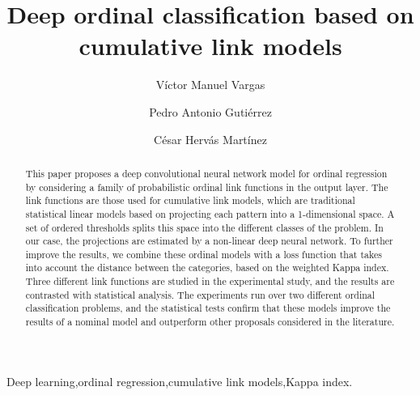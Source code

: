 \documentclass[preprint]{elsarticle}
\begin{document}
\begin{frontmatter}

\title{Deep ordinal classification based on cumulative link models}

\author{V\'ictor Manuel Vargas}
\author{Pedro Antonio Guti\'errez}
\author{C\'esar Herv\'as Mart\'inez}
\address{Department of Computer Science and Numerical Analysis, University of C\'ordoba, C\'ordoba, Spain}

\begin{abstract}
	This paper proposes a deep convolutional neural network model for ordinal regression by considering a family of probabilistic ordinal link functions in the output layer. The link functions are those used for cumulative link models, which are traditional statistical linear models based on projecting each pattern into a 1-dimensional space. A set of ordered thresholds splits this space into the different classes of the problem. In our case, the projections are estimated by a non-linear deep neural network. To further improve the results, we combine these ordinal models with a loss function that takes into account the distance between the categories, based on the weighted Kappa index. Three different link functions are studied in the experimental study, and the results are contrasted with statistical analysis. The experiments run over two different ordinal classification problems, and the statistical tests confirm that these models improve the results of a nominal model and outperform other proposals considered in the literature.
\end{abstract}

\begin{keyword}
Deep learning\sep ordinal regression\sep cumulative link models\sep Kappa index.
\end{keyword}

\end{frontmatter}

\end{document}
